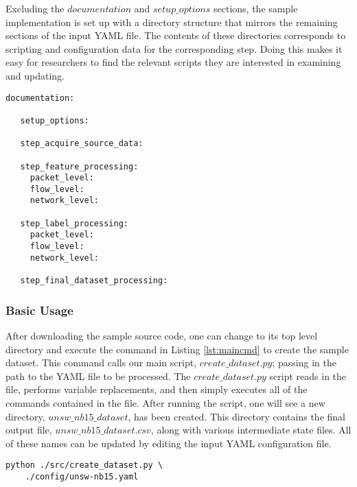 \documentclass[conference]{IEEEtran}
\begin{document}
Excluding the $documentation$ and $setup\_options$ sections, the sample implementation is set up with a directory structure that mirrors the remaining sections of the input YAML file.
The contents of these directories corresponds to scripting and configuration data for the corresponding step.
Doing this makes it easy for researchers to find the relevant scripts they are interested in examining and updating.

\noindent\begin{minipage}{\linewidth}
\begin{lstlisting}[aboveskip=10pt, label=lst:yamltemplate, caption={A template input file for our sample guidelines implementation.  Each section would be filled in with either information or explicit commands that get run.}, captionpos=b, basicstyle=\footnotesize, backgroundcolor=\color{gray!10!white}, frame=stb]
   documentation:
   
   setup_options:
   
   step_acquire_source_data:
   
   step_feature_processing:
     packet_level:
     flow_level:
     network_level:
   
   step_label_processing:
     packet_level:
     flow_level:
     network_level:
   
   step_final_dataset_processing:
\end{lstlisting}
\end{minipage}

\subsubsection{Basic Usage}\label{subsubsec:basic_usage}
After downloading the sample source code, one can change to its top level directory and execute the command in Listing \ref{lst:maincmd} to create the sample dataset.
This command calls our main script, $create\_dataset.py$; passing in the path to the YAML file to be processed.
The $create\_dataset.py$ script reads in the file, performs variable replacements, and then simply executes all of the commands contained  in the file.
After running the script, one will see a new directory, $unsw\_nb15\_dataset$, has been created.
This directory contains the final output file, $unsw\_nb15\_dataset.csv$, along with various intermediate state files.
All of these names can be updated by editing the input YAML configuration file.

\begin{lstlisting}[label=lst:maincmd, caption={The command to run to execute the sample implementation of the guidelines.}, captionpos=b, basicstyle=\footnotesize, backgroundcolor=\color{gray!10!white}, frame=stb, breaklines=True]
python ./src/create_dataset.py \
    ./config/unsw-nb15.yaml
\end{lstlisting}
\end{document}
